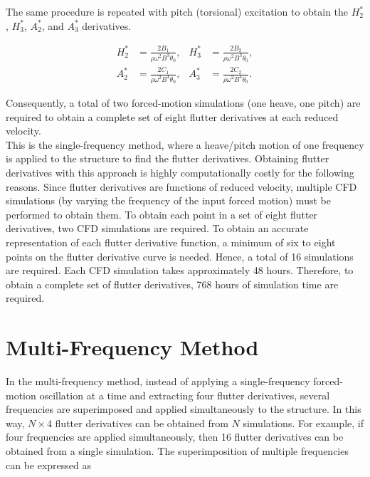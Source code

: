 \documentclass[../main]{subfiles}
\begin{document}
The same procedure is repeated with pitch (torsional) excitation to obtain the \(H_2^*\), \(H_3^*\), \(A_2^*\), and \(A_3^*\) derivatives.  

\begin{align}
H_2^* &= \frac{{2B_1}}{\rho \omega^2 B^3 \theta_{0}}, &
H_3^* &= \frac{{2B_2}}{\rho \omega^2 B^3 \theta_{0}}, \\[4pt]
A_2^* &= \frac{{2C_1}}{\rho \omega^2 B^4 \theta_{0}}, &
A_3^* &= \frac{2 C_2}{\rho \omega^2 B^4 \theta_{0}}.
\end{align}

Consequently, a total of two forced-motion simulations (one heave, one pitch) are required to obtain a 
complete set of eight flutter derivatives at each reduced velocity.\\

This is the single-frequency method, where a heave/pitch motion of one 
frequency is applied to the structure to find the flutter derivatives. Obtaining flutter derivatives with 
this approach is highly computationally costly for the following reasons. Since flutter 
derivatives are functions of reduced velocity, multiple CFD simulations (by varying the frequency 
of the input forced motion) must be performed to obtain them. To obtain each point in a set of eight 
flutter derivatives, two CFD simulations are required. To obtain an accurate representation of each 
flutter derivative function, a minimum of six to eight points on the flutter derivative curve is needed. 
Hence, a total of 16 simulations are required. Each CFD simulation takes approximately 48 hours. 
Therefore, to obtain a complete set of flutter derivatives, 768 hours of simulation time are required.


\section{Multi-Frequency Method}
\label{section: Multi-Frequency Method}

In the multi-frequency method, instead of applying a single-frequency forced-motion oscillation at a time and extracting four flutter derivatives,
several frequencies are superimposed and applied simultaneously to the structure. In this way, \(N \times 4\) flutter derivatives can be obtained from \(N\) simulations. 
For example, if four frequencies are applied simultaneously, then 16 flutter derivatives can be obtained from a single simulation.
The superimposition of multiple frequencies can be expressed as
\end{document}
